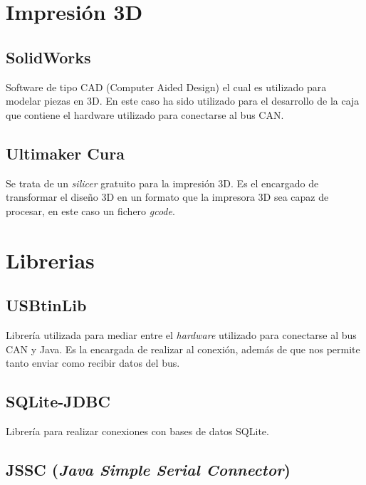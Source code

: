 \section{Impresión 3D}\label{impresion3d}

\subsection{SolidWorks}\label{solidworks}

Software de tipo CAD (Computer Aided Design) el cual es utilizado para modelar piezas en 3D. En este caso ha sido utilizado para el desarrollo de la caja que contiene el hardware utilizado para conectarse al bus CAN.

\subsection{Ultimaker Cura}\label{ultimaker_cura}

Se trata de un \emph{silicer} gratuito para la impresión 3D. Es el encargado de transformar el diseño 3D en un formato que la impresora 3D sea capaz de procesar, en este caso un fichero \emph{gcode}.

\section{Librerias}\label{librerias}

\subsection{USBtinLib}\label{usbtinlib}

Librería utilizada para mediar entre el \emph{hardware} utilizado para conectarse al bus CAN y Java. Es la encargada de realizar al conexión, además de que nos permite tanto enviar como recibir datos del bus. 

\subsection{SQLite-JDBC}\label{sqlite-jdbc}

Librería para realizar conexiones con bases de datos SQLite.


\subsection{JSSC (\emph{Java Simple Serial Connector})}\label{jssc_java_simple_serial_connector}

